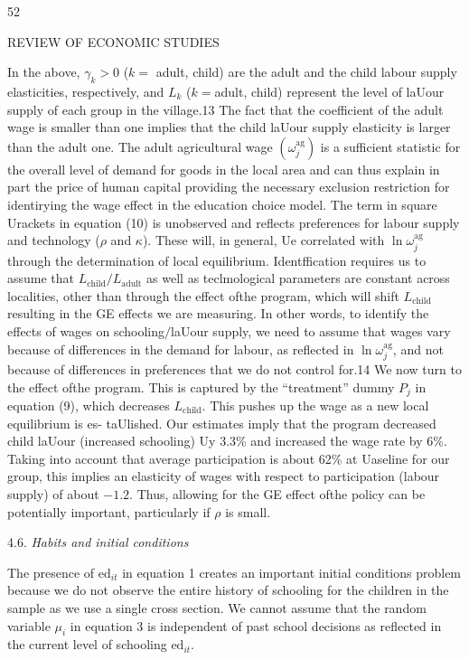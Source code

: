 52

REVIEW OF ECONOMIC STUDIES

In the above, $\gamma_{k}> 0$ ($k=$ adult, child) are the adult and the child labour supply elasticities, respectively, and $L_{k}$ ($k=$adult, child) represent the level of laUour supply of each group in the village.13 The fact that the coefficient of the adult wage is smaller than one implies that the child laUour supply elasticity is larger than the adult one. The adult agricultural wage $(\omega_{j}^{\mathrm{a}\mathrm{g}})$ is a sufficient statistic for the overall level of demand for goods in the local area and can thus explain in part the price of human capital providing the necessary exclusion restriction for identirying the wage effect in the education choice model. The term in square Urackets in equation (10) is unobserved and reflects preferences for labour supply and technology ($\rho$ and $\kappa$). These will, in general, Ue correlated with $\ln\omega_{j}^{\mathrm{a}\mathrm{g}}$ through the determination of local equilibrium. Identffication requires us to assume that $L_{\mathrm{c}\mathrm{h}\mathrm{i}\mathrm{l}\mathrm{d}}/L_{\mathrm{a}\mathrm{d}\mathrm{u}\mathrm{l}\mathrm{t}}$ as well as teclmological parameters are constant across localities, other than through the effect ofthe program, which will shift $L_{\mathrm{c}\mathrm{h}\mathrm{i}\mathrm{l}\mathrm{d}}$ resulting in the GE effects we are measuring. In other words, to identify the effects of wages on schooling$/$laUour supply, we need to assume that wages vary because of differences in the demand for labour, as reflected in $\ln\omega_{j}^{\mathrm{a}\mathrm{g}}$, and not because of differences in preferences that we do not control for.14 We now turn to the effect ofthe program. This is captured by the ``treatment'' dummy $P_{j}$ in equation (9), which decreases $L_{\mathrm{c}\mathrm{h}\mathrm{i}\mathrm{l}\mathrm{d}}$. This pushes up the wage as a new local equilibrium is es- taUlished. Our estimates imply that the program decreased child laUour (increased schooling) Uy 3.3\% and increased the wage rate by 6\%. Taking into account that average participation is about 62\% at Uaseline for our group, this implies an elasticity of wages with respect to participation (labour supply) of about $-1.2$. Thus, allowing for the GE effect ofthe policy can be potentially important, particularly if $\rho$ is small.

4.6. {\it Habits and initial conditions}

The presence of $\mathrm{e}\mathrm{d}_{it}$ in equation 1 creates an important initial conditions problem because we do not observe the entire history of schooling for the children in the sample as we use a single cross section. We cannot assume that the random variable $\mu_{i}$ in equation 3 is independent of past school decisions as reflected in the current level of schooling $\mathrm{e}\mathrm{d}_{it}.$

